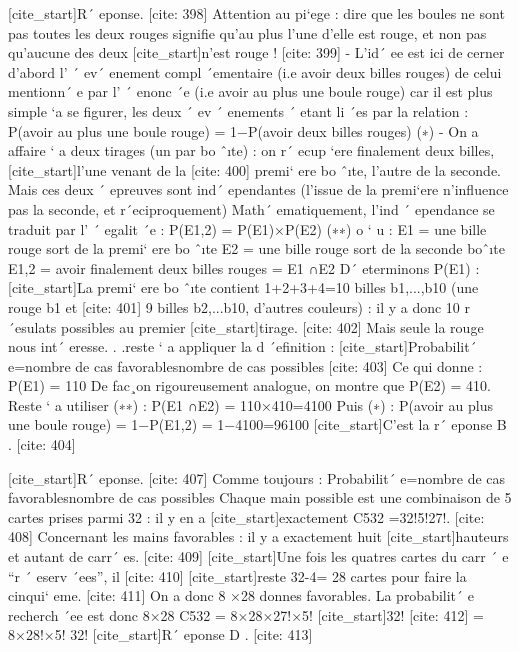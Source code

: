 [cite_start]R´ eponse. [cite: 398]
Attention au pi`ege : dire que les boules ne sont pas toutes les deux 
 rouges signifie qu’au plus l’une d’elle est rouge, et non pas qu’aucune des deux
 [cite_start]n’est rouge ! [cite: 399]
- L’id´ ee est ici de cerner d’abord l’ ´ ev´ enement compl ´ementaire 
 (i.e { avoir deux billes rouges}) de celui mentionn´ e par l’ ´ enonc ´e
 (i.e { avoir au plus une boule rouge}) car il est plus simple `a se figurer, les deux 
 ´ 
 ev
 ´ enements ´ etant li ´es par la relation : 
 P({avoir au plus une boule rouge}) = 1−P({avoir deux billes rouges}) (∗)
 - On a affaire ` a deux tirages (un par bo ˆıte) : on r´ ecup `ere finalement deux billes, 
 [cite_start]l’une venant de la [cite: 400]
premi` ere bo ˆıte, l’autre de la seconde.
 Mais ces deux ´ epreuves sont ind´ ependantes (l’issue de la premi`ere n’influence 
 pas la seconde, et r´eciproquement) 
 Math´ ematiquement, l’ind ´ ependance se traduit par l’ ´ egalit ´e : 
 P(E1,2) = P(E1)×P(E2) (∗∗)
 o
 `
 u : 
 E1 = {une bille rouge sort de la premi` ere bo ˆıte}
 E2 = {une bille rouge sort de la seconde boˆıte}
 E1,2 = {avoir finalement deux billes rouges} = E1 ∩E2
 D´ eterminons P(E1) :
 [cite_start]La premi` ere bo ˆıte contient 1+2+3+4=10 billes {b1,...,b10} (une rouge b1 et [cite: 401]
9
 billes b2,...b10, d’autres couleurs) : il y a donc 10 r´esulats possibles au premier 
 [cite_start]tirage. [cite: 402]
Mais seule la rouge nous int´ eresse. . .reste ` a appliquer la d ´efinition : 
 [cite_start]Probabilit´ e=nombre de cas favorablesnombre de cas possibles [cite: 403]
Ce qui donne :
 P(E1) = 110
 De fac¸on rigoureusement analogue, on montre que P(E2) = 410.
 Reste ` a utiliser (∗∗) :
 P(E1 ∩E2) = 110×410=4100
 Puis (∗) :
 P({avoir au plus une boule rouge}) = 1−P(E1,2) = 1−4100=96100
 [cite_start]C’est la r´ eponse B . [cite: 404]

[cite_start]R´ eponse. [cite: 407]
Comme toujours :
 Probabilit´ e=nombre de cas favorablesnombre de cas possibles
 Chaque main possible est une combinaison de 5 cartes prises parmi 32 : il y en a
 [cite_start]exactement C532 =32!5!27!. [cite: 408]
Concernant les mains favorables : il y a exactement huit
 [cite_start]hauteurs et autant de carr´ es. [cite: 409]
[cite_start]Une fois les quatres cartes du carr ´ e “r ´ eserv ´ees”, il [cite: 410]
[cite_start]reste 32-4= 28 cartes pour faire la cinqui` eme. [cite: 411]
On a donc 8 ×28 donnes favorables.
 La probabilit´ e recherch ´ee est donc 
 8×28
 C532
 =
 8×28×27!×5!
 [cite_start]32! [cite: 412]
=
 8×28!×5!
 32!
 [cite_start]R´ eponse D . [cite: 413]

